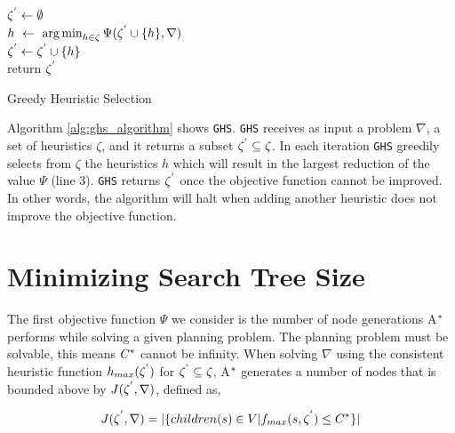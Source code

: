 \begin{algorithm}

$\zeta\sp{'} \leftarrow \emptyset$\\
 {
	$h\ \leftarrow\ \argminA_{h \in \zeta}  \Psi(\zeta\sp{'} \cup \{h\}, \nabla)$\\
	$\zeta\sp{'} \leftarrow \zeta\sp{'} \cup \{h\}$\\
} 
return $\zeta\sp{'}$
\caption{Greedy Heuristic Selection}
\label{alg:ghs_algorithm}
\end{algorithm}

Algorithm \ref{alg:ghs_algorithm} shows \texttt{GHS}. \texttt{GHS} receives as input a problem $\nabla$, a set of heuristics $\zeta$, and it returns a subset $\zeta\sp{'} \subseteq \zeta$. In each iteration \texttt{GHS} greedily selects from $\zeta$ the heuristics $h$ which will result in the largest reduction of the value $\Psi$ (line 3). \texttt{GHS} returns $\zeta\sp{'}$ once the objective function cannot be improved. In other words, the algorithm will halt when adding another heuristic does not improve the objective function.

\section{Minimizing Search Tree Size}
\noindent
The first objective function $\Psi$ we consider is the number of node generations A$\sp{*}$ performs while solving a given planning problem. The planning problem must be solvable, this means $C\sp{*}$ cannot be infinity. When solving $\nabla$ using the consistent heuristic function $h_{max}(\zeta\sp{'})$  for $\zeta\sp{'} \subseteq \zeta$, A$\sp{*}$ generates a number of nodes that is bounded above by $J(\zeta\sp{'},\nabla)$, defined as,

\begin{equation}
J(\zeta\sp{'},\nabla) = |\{children(s) \in V | f_{max}(s,\zeta\sp{'}) \leq C\sp{*}\}|
\label{eq:eq_size_search_tree_1}
\end{equation}


